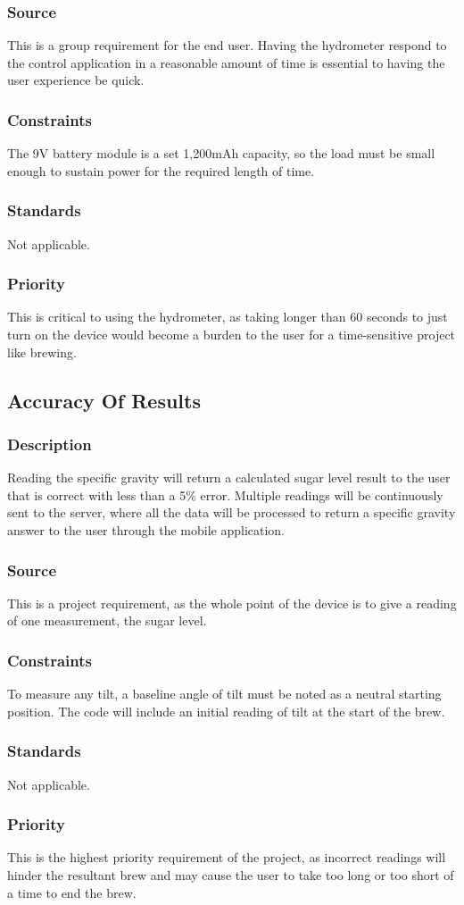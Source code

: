 \subsubsection{Source}
This is a group requirement for the end user. Having the hydrometer respond to the control application in a reasonable amount of time is essential to having the user experience be quick. 
\subsubsection{Constraints}
The 9V battery module is a set 1,200mAh capacity, so the load must be small enough to sustain power for the required length of time.
\subsubsection{Standards}
Not applicable.
\subsubsection{Priority}
This is critical to using the hydrometer, as taking longer than 60 seconds to just turn on the device would become a burden to the user for a time-sensitive project like brewing.
\subsection{Accuracy Of Results}
\subsubsection{Description}
Reading the specific gravity will return a calculated sugar level result to the user that is correct with less than a 5\% error. Multiple readings will be continuously sent to the server, where all the data will be processed to return a specific gravity answer to the user through the mobile application.
\subsubsection{Source}
This is a project requirement, as the whole point of the device is to give a reading of one measurement, the sugar level.
\subsubsection{Constraints}
To measure any tilt, a baseline angle of tilt must be noted as a neutral starting position. The code will include an initial reading of tilt at the start of the brew.
\subsubsection{Standards}
Not applicable.
\subsubsection{Priority}
This is the highest priority requirement of the project, as incorrect readings will hinder the resultant brew and may cause the user to take too long or too short of a time to end the brew.